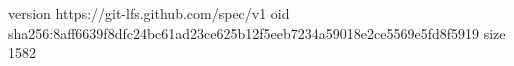 version https://git-lfs.github.com/spec/v1
oid sha256:8aff6639f8dfc24bc61ad23ce625b12f5eeb7234a59018e2ce5569e5fd8f5919
size 1582

